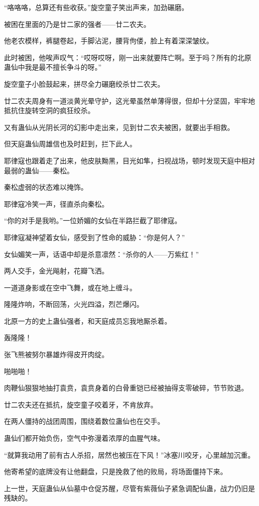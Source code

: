 \begin{this_body}
“咯咯咯，总算还有些收获。”旋空童子笑出声来，加劲碾磨。

被困在里面的乃是廿二家的强者——廿二农夫。

他老农模样，裤腿卷起，手脚沾泥，腰背佝偻，脸上有着深深皱纹。

此时被困，他唉声叹气：“哎呀哎呀，刚一出来就要阵亡啊。至于吗？所有的北原蛊仙中我是最不擅长争斗的呀。”

旋空童子小脸鼓起来，拼尽全力碾磨绞杀廿二农夫。

廿二农夫周身有一道淡黄光晕守护，这光晕虽然单薄得很，但却十分坚固，牢牢地抵抗住旋转空洞的疯狂绞杀。

又有蛊仙从光阴长河的幻影中走出来，见到廿二农夫被困，就要出手相救。

但天庭蛊仙周雄信也及时赶到，拦下此人。

耶律寇也跟着走了出来，他皮肤黝黑，目光如隼，扫视战场，顿时发现天庭中相对最弱的蛊仙——秦松。

秦松虚弱的状态难以掩饰。

耶律寇冷笑一声，径直杀向秦松。

“你的对手是我哟。”一位娇媚的女仙在半路拦截了耶律寇。

耶律寇凝神望着女仙，感受到了性命的威胁：“你是何人？”

女仙媚笑一声，话语中却是杀意凛然：“杀你的人——万紫红！”

两人交手，金光飚射，花瓣飞洒。

一道道身影或在空中飞舞，或在地上缠斗。

隆隆炸响，不断回荡，火光四溢，烈芒爆闪。

北原一方的史上蛊仙强者，和天庭成员忘我地厮杀着。

轰隆隆！

张飞熊被努尔暴雄炸得皮开肉绽。

啪啪啪！

肉鞭仙狠狠地抽打袁贲，袁贲身着的白骨重铠已经被抽得支零破碎，节节败退。

廿二农夫还在抵抗，旋空童子咬着牙，不肯放弃。

在两人僵持的战团周围，围绕着数位蛊仙也在交手。

蛊仙们都开始负伤，空气中弥漫着浓厚的血腥气味。

“就算我动用了前有古人杀招，居然也被压在下风！”冰塞川咬牙，心里越加沉重。

他寄希望的底牌没有让他翻盘，只是挽救了他的败局，将场面僵持下来。

上一世，天庭蛊仙从仙墓中仓促苏醒，尽管有紫薇仙子紧急调配仙蛊，战力仍旧是残缺的。


\end{this_body}
